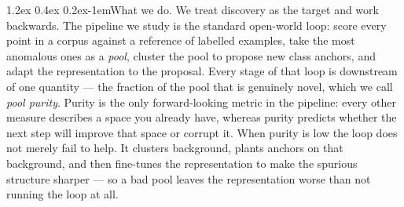 \documentclass{article}
\makeatletter
\renewcommand\paragraph{\@startsection{paragraph}{4}{\z@}%
  {1.2ex \@plus 0.4ex \@minus 0.2ex}{-1em}{\normalsize\bf}}
\makeatother
\begin{document}
\paragraph{What we do.}
We treat discovery as the target and work backwards. The pipeline we study is
the standard open-world loop: score every point in a corpus against a
reference of labelled examples, take the most anomalous ones as a
\emph{pool}, cluster the pool to propose new class anchors, and adapt the
representation to the proposal. Every stage of that loop is downstream of one
quantity --- the fraction of the pool that is genuinely novel, which we call
\emph{pool purity}. Purity is the only forward-looking metric in the
pipeline: every other measure describes a space you already have, whereas
purity predicts whether the next step will improve that space or corrupt it.
When purity is low the loop does not merely fail to help. It clusters
background, plants anchors on that background, and then fine-tunes the
representation to make the spurious structure sharper --- so a bad pool leaves
the representation worse than not running the loop at all.
\end{document}
